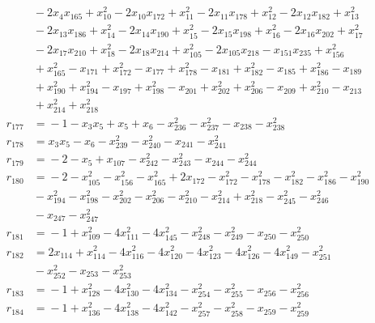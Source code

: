 \begin{align*}
&{}-2x_{4}x_{165} +x_{10}^{2} -2x_{10}x_{172} +x_{11}^{2} -2x_{11}x_{178} +x_{12}^{2} -2x_{12}x_{182} +x_{13}^{2} \\
&{}-2x_{13}x_{186} +x_{14}^{2} -2x_{14}x_{190} +x_{15}^{2} -2x_{15}x_{198} +x_{16}^{2} -2x_{16}x_{202} +x_{17}^{2} \\
&{}-2x_{17}x_{210} +x_{18}^{2} -2x_{18}x_{214} +x_{105}^{2} -2x_{105}x_{218} -x_{151}x_{235} +x_{156}^{2} \\
&{}+x_{165}^{2} -x_{171} +x_{172}^{2} -x_{177} +x_{178}^{2} -x_{181} +x_{182}^{2} -x_{185} +x_{186}^{2} -x_{189} \\
&{}+x_{190}^{2} +x_{194}^{2} -x_{197} +x_{198}^{2} -x_{201} +x_{202}^{2} +x_{206}^{2} -x_{209} +x_{210}^{2} -x_{213} \\
&{}+x_{214}^{2} +x_{218}^{2} \\
r_{177} &={}-1 -x_{3}x_{5} +x_{5} +x_{6} -x_{236}^{2} -x_{237}^{2} -x_{238} -x_{238}^{2} \\
r_{178} &={}x_{3}x_{5} -x_{6} -x_{239}^{2} -x_{240}^{2} -x_{241} -x_{241}^{2} \\
r_{179} &={}-2 -x_{5} +x_{107} -x_{242}^{2} -x_{243}^{2} -x_{244} -x_{244}^{2} \\
r_{180} &={}-2 -x_{105}^{2} -x_{156}^{2} -x_{165}^{2} +2x_{172} -x_{172}^{2} -x_{178}^{2} -x_{182}^{2} -x_{186}^{2} -x_{190}^{2} \\
&{}-x_{194}^{2} -x_{198}^{2} -x_{202}^{2} -x_{206}^{2} -x_{210}^{2} -x_{214}^{2} +x_{218}^{2} -x_{245}^{2} -x_{246}^{2} \\
&{}-x_{247} -x_{247}^{2} \\
r_{181} &={}-1 +x_{109}^{2} -4x_{111}^{2} -4x_{145}^{2} -x_{248}^{2} -x_{249}^{2} -x_{250} -x_{250}^{2} \\
r_{182} &={}2x_{114} +x_{114}^{2} -4x_{116}^{2} -4x_{120}^{2} -4x_{123}^{2} -4x_{126}^{2} -4x_{149}^{2} -x_{251}^{2} \\
&{}-x_{252}^{2} -x_{253} -x_{253}^{2} \\
r_{183} &={}-1 +x_{128}^{2} -4x_{130}^{2} -4x_{134}^{2} -x_{254}^{2} -x_{255}^{2} -x_{256} -x_{256}^{2} \\
r_{184} &={}-1 +x_{136}^{2} -4x_{138}^{2} -4x_{142}^{2} -x_{257}^{2} -x_{258}^{2} -x_{259} -x_{259}^{2}
\end{align*}
\endgroup
